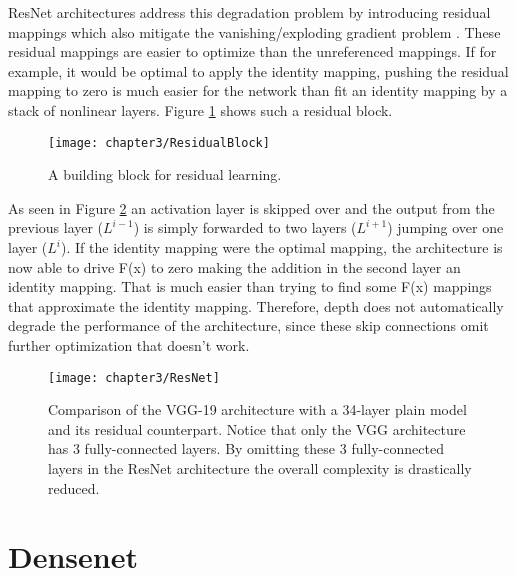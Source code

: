 ResNet architectures address this degradation problem by introducing residual mappings which also mitigate the vanishing/exploding gradient problem . These residual mappings are easier to optimize than the unreferenced mappings. If for example, it would be optimal to apply the identity mapping, pushing the residual mapping to zero is much easier for the network than fit an identity mapping by a stack of nonlinear layers. Figure \ref{fig:ResidualBlock} shows such a residual block.\\


\begin{figure}[H]
  \centering
  \caption{A building block for residual learning. \cite{he2016deep}}
  \texttt{[image: chapter3/ResidualBlock]}
  \label{fig:ResidualBlock}
\end{figure}

As seen in Figure \ref{fig:ResNet} an activation layer is skipped over and the output from the previous layer ($L^{i-1}$) is simply forwarded to two layers ($L^{i+1}$) jumping over one layer ($L^{i}$). If the identity mapping were the optimal mapping, the architecture is now able to drive F(x) to zero making the addition in the second layer an identity mapping. That is much easier than trying to find some F(x) mappings that approximate the identity mapping. Therefore, depth does not automatically degrade the performance of the architecture, since these skip connections omit further optimization that doesn't work.\\


\begin{figure}[H]
  \centering
  \caption{Comparison of the VGG-19 architecture with a 34-layer plain model and its residual counterpart. Notice that only the VGG architecture has 3 fully-connected layers. By omitting these 3 fully-connected layers in the ResNet architecture the overall complexity is drastically reduced. \cite{he2016deep}}
  \texttt{[image: chapter3/ResNet]}
  \label{fig:ResNet}
\end{figure}

\section{Densenet}

